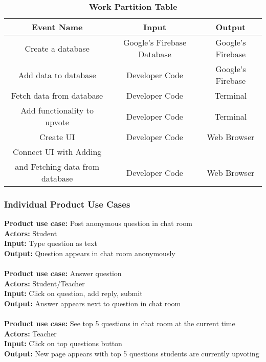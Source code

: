 \documentclass[12pt, titlepage]{article}
\begin{document}
\begin{table}[H]
\centering
\begin{tabular}{|c|c|c|} \hline
 \textbf{Event  Name} & \textbf{Input} &  \textbf{Output} \\ \hline
 Create a database & Google’s Firebase Database & Google’s Firebase  \\\hline
 Add data to database & Developer Code & Google’s Firebase \\\hline
 Fetch data from database & Developer Code & Terminal  \\\hline
 Add functionality to upvote & Developer Code & Terminal  \\\hline
 Create UI & Developer Code & Web Browser  \\\hline
 Connect UI with Adding  & & \\
 and Fetching data from database & Developer Code & Web Browser\\\hline
\end{tabular}
\caption{\bf Work Partition Table}
\label{TeamMemberRoles}
\end{table}

\subsubsection{Individual Product Use Cases}

\textbf{Product use case:} Post anonymous question in chat room 
\\
\textbf{Actors:} Student 
\\
\textbf{Input:} Type question as text
\\
\textbf{Output:} Question appears in chat room anonymously 
\\
\\
\textbf{Product use case:} Answer question
\\
\textbf{Actors:} Student/Teacher 
\\
\textbf{Input:} Click on question, add reply, submit 
\\
\textbf{Output:} Answer appears next to question in chat room 
\\
\\
\textbf{Product use case:} See top 5 questions in chat room at the current time
\\
\textbf{Actors:} Teacher 
\\
\textbf{Input:} Click on top questions button 
\\
\textbf{Output:} New page appears with top 5 questions students are currently upvoting 
\end{document}
